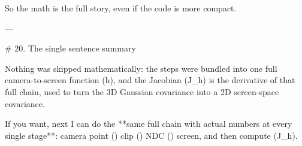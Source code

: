So the math is the full story, even if the code is more compact.

---

# 20. The single sentence summary

Nothing was skipped mathematically: the steps were bundled into one full camera-to-screen function (h), and the Jacobian (J_h) is the derivative of that full chain, used to turn the 3D Gaussian covariance into a 2D screen-space covariance.

If you want, next I can do the **same full chain with actual numbers at every single stage**:
camera point (\to) clip (\to) NDC (\to) screen, and then compute (J_h).
